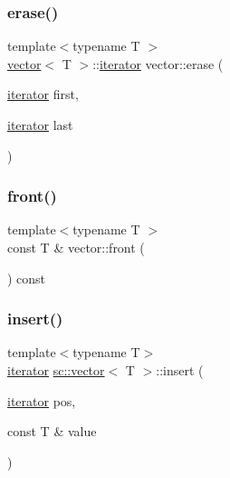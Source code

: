 \mbox{\label{classsc_1_1vector_a1371718053d10dbd4c2c699b1de5108d}} 
\subsubsection{\texorpdfstring{erase()}{erase()}\hspace{0.1cm}{\footnotesize\ttfamily [2/2]}}
{\footnotesize\ttfamily template$<$typename T $>$ \\
\mbox{\hyperlink{classsc_1_1vector}{vector}}$<$ T $>$\+::\mbox{\hyperlink{classsc_1_1vector_1_1iterator}{iterator}} vector\+::erase (\begin{DoxyParamCaption}\item[{\mbox{\hyperlink{classsc_1_1vector_1_1iterator}{iterator}}}]{first,  }\item[{\mbox{\hyperlink{classsc_1_1vector_1_1iterator}{iterator}}}]{last }\end{DoxyParamCaption})}

\mbox{\label{classsc_1_1vector_acc1c96630d9a746903411b17240d265d}} 
\subsubsection{\texorpdfstring{front()}{front()}}
{\footnotesize\ttfamily template$<$typename T $>$ \\
const T \& vector\+::front (\begin{DoxyParamCaption}{ }\end{DoxyParamCaption}) const}

\mbox{\label{classsc_1_1vector_ac55608c5cee9a8311cbe7c4fde998a9f}} 
\subsubsection{\texorpdfstring{insert()}{insert()}\hspace{0.1cm}{\footnotesize\ttfamily [1/9]}}
{\footnotesize\ttfamily template$<$typename T$>$ \\
\mbox{\hyperlink{classsc_1_1vector_1_1iterator}{iterator}} \mbox{\hyperlink{classsc_1_1vector}{sc\+::vector}}$<$ T $>$\+::insert (\begin{DoxyParamCaption}\item[{\mbox{\hyperlink{classsc_1_1vector_1_1iterator}{iterator}}}]{pos,  }\item[{const T \&}]{value }\end{DoxyParamCaption})}

